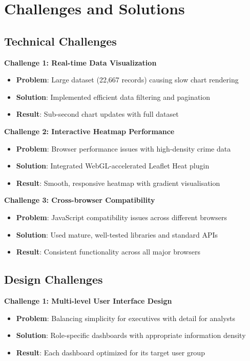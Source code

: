 \documentclass[12pt,a4paper]{article}
\begin{document}
\section{Challenges and Solutions}

\subsection{Technical Challenges}

\textbf{Challenge 1: Real-time Data Visualization}
\begin{itemize}
    \item \textbf{Problem}: Large dataset (22,667 records) causing slow chart rendering
    \item \textbf{Solution}: Implemented efficient data filtering and pagination
    \item \textbf{Result}: Sub-second chart updates with full dataset
\end{itemize}

\textbf{Challenge 2: Interactive Heatmap Performance}
\begin{itemize}
    \item \textbf{Problem}: Browser performance issues with high-density crime data
    \item \textbf{Solution}: Integrated WebGL-accelerated Leaflet Heat plugin
    \item \textbf{Result}: Smooth, responsive heatmap with gradient visualisation
\end{itemize}

\textbf{Challenge 3: Cross-browser Compatibility}
\begin{itemize}
    \item \textbf{Problem}: JavaScript compatibility issues across different browsers
    \item \textbf{Solution}: Used mature, well-tested libraries and standard APIs
    \item \textbf{Result}: Consistent functionality across all major browsers
\end{itemize}

\subsection{Design Challenges}

\textbf{Challenge 1: Multi-level User Interface Design}
\begin{itemize}
    \item \textbf{Problem}: Balancing simplicity for executives with detail for analysts
    \item \textbf{Solution}: Role-specific dashboards with appropriate information density
    \item \textbf{Result}: Each dashboard optimized for its target user group
\end{itemize}
\end{document}

